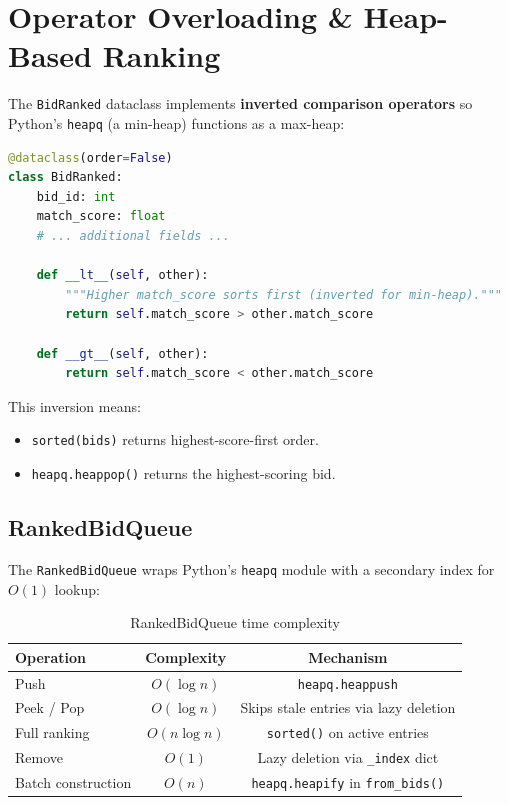 \documentclass[12pt, a4paper]{report}
\begin{document}
\section{Operator Overloading \& Heap-Based Ranking}

The \texttt{BidRanked} dataclass implements \textbf{inverted comparison operators} so Python's \texttt{heapq} (a min-heap) functions as a max-heap:

\begin{lstlisting}[caption={Inverted comparison for max-heap behavior}, language=Python]
@dataclass(order=False)
class BidRanked:
    bid_id: int
    match_score: float
    # ... additional fields ...

    def __lt__(self, other):
        """Higher match_score sorts first (inverted for min-heap)."""
        return self.match_score > other.match_score

    def __gt__(self, other):
        return self.match_score < other.match_score
\end{lstlisting}

This inversion means:
\begin{itemize}
  \item \texttt{sorted(bids)} returns highest-score-first order.
  \item \texttt{heapq.heappop()} returns the highest-scoring bid.
\end{itemize}

\subsection{RankedBidQueue}

The \texttt{RankedBidQueue} wraps Python's \texttt{heapq} module with a secondary index for $O(1)$ lookup:

\begin{table}[H]
\centering
\caption{RankedBidQueue time complexity}
\begin{tabular}{@{}lcc@{}}
\toprule
\textbf{Operation} & \textbf{Complexity} & \textbf{Mechanism} \\
\midrule
Push & $O(\log n)$ & \texttt{heapq.heappush} \\
Peek / Pop & $O(\log n)$ & Skips stale entries via lazy deletion \\
Full ranking & $O(n \log n)$ & \texttt{sorted()} on active entries \\
Remove & $O(1)$ & Lazy deletion via \texttt{\_index} dict \\
Batch construction & $O(n)$ & \texttt{heapq.heapify} in \texttt{from\_bids()} \\
\bottomrule
\end{tabular}
\end{table}
\end{document}
